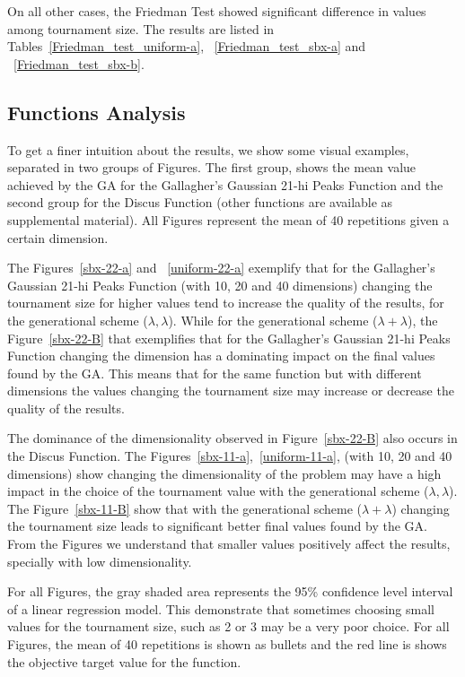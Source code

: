 On all other cases, the Friedman Test showed significant difference in values among tournament size. The results are listed in Tables~\ref{Friedman_test_uniform-a}, ~\ref{Friedman_test_sbx-a} and ~\ref{Friedman_test_sbx-b}.

\subsection{Functions Analysis}

To get a finer intuition about the results, we show some visual examples, separated in two groups of Figures. The first group, shows the mean value achieved by the GA for the Gallagher's Gaussian 21-hi Peaks Function and the second group for the Discus Function (other functions are available as supplemental material). All Figures represent the mean of 40 repetitions given a certain dimension.


The Figures~\ref{sbx-22-a} and ~\ref{uniform-22-a} exemplify that for the Gallagher's Gaussian 21-hi Peaks Function (with 10, 20 and 40 dimensions) changing the tournament size for higher values tend to increase the quality of the results, for the generational scheme ($\lambda, \lambda$). While for the generational scheme ($\lambda + \lambda$), the Figure~\ref{sbx-22-B} that exemplifies that for the Gallagher's Gaussian 21-hi Peaks Function changing the dimension has a dominating impact on the final values found by the GA. This means that for the same function but with different dimensions the values changing the tournament size may increase or decrease the quality of the results.

The dominance of the dimensionality observed in Figure~\ref{sbx-22-B} also occurs in the Discus Function. The Figures~\ref{sbx-11-a},~\ref{uniform-11-a}, (with 10, 20 and 40 dimensions) show  changing the dimensionality of the problem may have a high impact in the choice of the tournament value with the generational scheme ($\lambda, \lambda$). The Figure~\ref{sbx-11-B} show that with the generational scheme ($\lambda + \lambda$) changing the tournament size leads to significant better final values found by the GA. From the Figures we understand that smaller values positively affect the results, specially with low dimensionality. 

For all Figures, the gray shaded area represents the 95\% confidence level interval of a linear regression model. This demonstrate that sometimes choosing small values for the tournament size, such as 2 or 3 may be a very poor choice. For all Figures, the mean of 40 repetitions is shown as bullets and the red line is shows the objective target value for the function.


